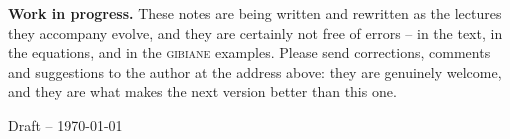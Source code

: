\begin{titlepage}
\begin{center}
\end{center}
\vspace{0.9cm}
\begin{small}
\textbf{Work in progress.} These notes are being written and rewritten as the
lectures they accompany evolve, and they are certainly not free of errors --
in the text, in the equations, and in the \textsc{gibiane} examples. Please
send corrections, comments and suggestions to the author at the address
above: they are genuinely welcome, and they are what makes the next version
better than this one.
\end{small}
\par\vspace{10pt}
{\small Draft -- \today\par}
\end{titlepage}
\cleardoublepage
